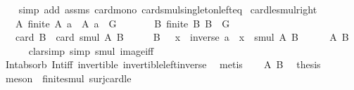\begin{isabellebody}
%
\isadelimproof
\ \ %
\endisadelimproof
%
\isatagproof
{}\isamarkupfalse%
\ {\isacharparenleft}{\kern0pt}simp\ add{\isacharcolon}{\kern0pt}\ assms\ card{\isacharunderscore}{\kern0pt}mono\ card{\isacharunderscore}{\kern0pt}smul{\isacharunderscore}{\kern0pt}singleton{\isacharunderscore}{\kern0pt}left{\isacharunderscore}{\kern0pt}eq{\isacharparenright}{\kern0pt}%
\endisatagproof
{\isafoldproof}%
%
\isadelimproof
\isanewline
%
\endisadelimproof
\isanewline
{}\isamarkupfalse%
\ card{\isacharunderscore}{\kern0pt}le{\isacharunderscore}{\kern0pt}smul{\isacharunderscore}{\kern0pt}right{\isacharcolon}{\kern0pt}\isanewline
\ \ \ A{\isacharcolon}{\kern0pt}\ {\isachardoublequoteopen}finite\ A{\isachardoublequoteclose}\ {\isachardoublequoteopen}a\ {\isasymin}\ A{\isachardoublequoteclose}\ {\isachardoublequoteopen}a\ {\isasymin}\ G{\isachardoublequoteclose}\isanewline
\ \ \ \ \ \ \ B{\isacharcolon}{\kern0pt}\ {\isachardoublequoteopen}finite\ B{\isachardoublequoteclose}\ {\isachardoublequoteopen}B\ {\isasymsubseteq}\ G{\isachardoublequoteclose}\isanewline
\ \ \ {\isachardoublequoteopen}card\ B\ {\isasymle}\ card\ {\isacharparenleft}{\kern0pt}smul\ A\ B{\isacharparenright}{\kern0pt}{\isachardoublequoteclose}\isanewline
%
\isadelimproof
%
\endisadelimproof
%
\isatagproof
{}\isamarkupfalse%
\ {\isacharminus}{\kern0pt}\isanewline
\ \ \isamarkupfalse%
\ {\isachardoublequoteopen}B\ {\isasymsubseteq}\ {\isacharparenleft}{\kern0pt}{\isasymlambda}\ x{\isachardot}{\kern0pt}\ \ {\isacharparenleft}{\kern0pt}inverse\ a{\isacharparenright}{\kern0pt}\ {\isasymcdot}\ x{\isacharparenright}{\kern0pt}\ {\isacharbackquote}{\kern0pt}\ smul\ A\ B{\isachardoublequoteclose}\isanewline
\ \ \ \ \isamarkupfalse%
\ A\ B\isanewline
\ \ \ \ \isamarkupfalse%
\ {\isacharparenleft}{\kern0pt}clarsimp\ simp{\isacharcolon}{\kern0pt}\ smul\ image{\isacharunderscore}{\kern0pt}iff{\isacharparenright}{\kern0pt}\isanewline
\ \ \ \ \isamarkupfalse%
\ Int{\isacharunderscore}{\kern0pt}absorb{}\ Int{\isacharunderscore}{\kern0pt}iff\ invertible\ invertible{\isacharunderscore}{\kern0pt}left{\isacharunderscore}{\kern0pt}inverse{}\ \isamarkupfalse%
\ metis\isanewline
\ \ \isamarkupfalse%
\ A\ B\ \isamarkupfalse%
\ {\isacharquery}{\kern0pt}thesis\isanewline
\ \ \ \ \isamarkupfalse%
\ {\isacharparenleft}{\kern0pt}meson\ \ finite{\isacharunderscore}{\kern0pt}smul\ surj{\isacharunderscore}{\kern0pt}card{\isacharunderscore}{\kern0pt}le{\isacharparenright}{\kern0pt}\isanewline

\end{isabellebody}
